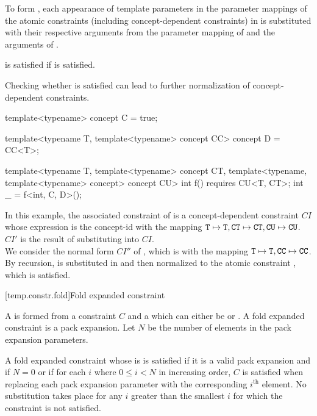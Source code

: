 \pnum
To form ,
each appearance of  template parameters in
the parameter mappings of the atomic constraints
(including concept-dependent constraints)
in 
is substituted with their respective arguments from
the parameter mapping of  and the arguments of .

\pnum
{} is satisfied if  is satisfied.
\begin{note}
Checking whether  is satisfied
can lead to further normalization of concept-dependent constraints.
\end{note}
\begin{example}
\begin{codeblock}
template<typename>
concept C = true;

template<typename T, template<typename> concept CC>
concept D = CC<T>;

template<typename T,
         template<typename> concept CT,
         template<typename, template<typename> concept> concept CU>
int f() requires CU<T, CT>;
int _ = f<int, C, D>();
\end{codeblock}
In this example, the associated constraint of 
is a concept-dependent constraint $CI$
whose expression is the concept-id  with the mapping
$\texttt{\protect T} \mapsto \texttt{\protect T}, \texttt{\protect CT} \mapsto \texttt{\protect CT}, \texttt{\protect CU} \mapsto \texttt{\protect CU}$.\\
$CI'$ is the result of substituting  into $CI$.\\
We consider the normal form $CI''$ of ,
which is  with the mapping
$\texttt{\protect T} \mapsto \texttt{\protect T}, \texttt{\protect CC} \mapsto \texttt{\protect CC}$.\\
By recursion,  is substituted in  and then
normalized to the atomic constraint , which is satisfied.
\end{example}

[temp.constr.fold]{Fold expanded constraint}

\pnum
A  is formed from a constraint $C$ and
a 
which can either be \tcode{\&\&} or \tcode{||}.
A fold expanded constraint is a pack expansion.
Let $N$ be the number of elements
in the pack expansion parameters.

\pnum
A fold expanded constraint whose  is \tcode{\&\&}
is satisfied if it is a valid pack expansion and
if $N = 0$ or if for each $i$ where $0 \le i < N$ in increasing order,
$C$ is satisfied
when replacing each pack expansion parameter
with the corresponding $i^\text{th}$ element.
No substitution takes place for any $i$ greater than
the smallest $i$ for which the constraint is not satisfied.

